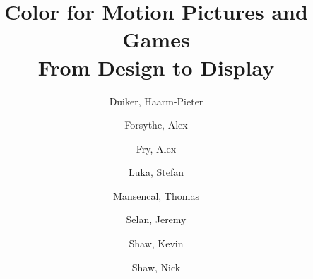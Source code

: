 \title{
    {\LARGE Color for Motion Pictures and Games}\\
    \vspace{5mm}
    {\large From Design to Display}
}

\author{
    Duiker, Haarm-Pieter\\
    \and
    Forsythe, Alex\\
    \and
    Fry, Alex\\
    \and
    Luka, Stefan\\
    \and
    Mansencal, Thomas\\
    \and
    Selan, Jeremy\\
    \and
    Shaw, Kevin\\
    \and
    Shaw, Nick\\
}

\date{}
